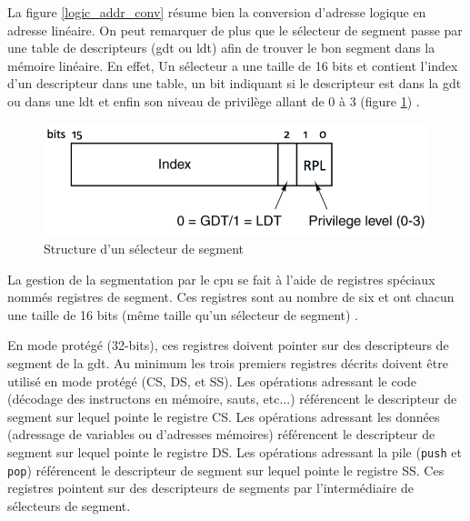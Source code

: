 La figure \ref{logic_addr_conv} résume bien la conversion d'adresse logique en
adresse linéaire. On peut remarquer de plus que le sélecteur de segment passe
par une table de descripteurs (\acrshort{gdt} ou \acrshort{ldt}) afin de trouver
le bon segment dans la mémoire linéaire. En effet, Un sélecteur a une taille de
16 bits et contient l'index d'un descripteur dans une table, un bit indiquant si
le descripteur est dans la \acrshort{gdt} ou dans une \acrshort{ldt} et enfin son
niveau de privilège allant de 0 à 3 (figure \ref{seg_sel}) \cite{ref42}.

\begin{figure}[!h]
  \centering
  \includegraphics[scale=0.6]{images/seg_sel.png}
  \caption{Structure d'un sélecteur de segment}
  \label{seg_sel}
\end{figure}

La gestion de la segmentation par le \acrshort{cpu} se fait à l'aide de registres
spéciaux nommés registres de segment. Ces registres sont au nombre de six et ont
chacun une taille de 16 bits (même taille qu'un sélecteur de segment) \cite{ref42,ref18}.

\begin{center}
    \label{table_seg_reg}
\end{center}

En mode protégé (32-bits), ces registres doivent pointer sur des descripteurs
de segment de la \acrshort{gdt}. Au minimum les trois premiers registres décrits
doivent être utilisé en mode protégé (CS, DS, et SS). Les opérations adressant
le code (décodage des instructons en mémoire, sauts, etc...) référencent le descripteur
de segment sur lequel pointe le registre CS. Les opérations adressant les données
(adressage de variables ou d'adresses mémoires) référencent le descripteur de segment
sur lequel pointe le registre DS. Les opérations adressant la pile (\texttt{push}
et \texttt{pop}) référencent le descripteur de segment sur lequel pointe
le registre SS. Ces registres pointent sur des descripteurs de segments par l'intermédiaire
de sélecteurs de segment. \\

